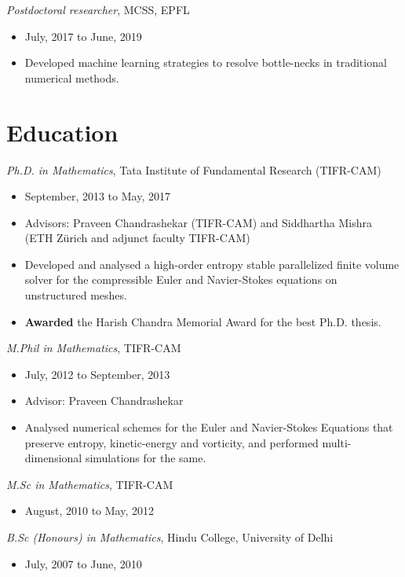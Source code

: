 \documentclass[margin]{res}
\begin{document}
\begin{resume}
{\it Postdoctoral researcher}, MCSS, EPFL
 \begin{itemize} \itemsep -2pt  %
 \item 
July, 2017 to June, 2019
\item Developed machine learning strategies to resolve bottle-necks in traditional numerical methods.  
\end{itemize}

\section{Education}
{\it Ph.D. in Mathematics}, Tata Institute of Fundamental Research (TIFR-CAM)
 \begin{itemize} \itemsep -2pt  %
 \item September, 2013 to May, 2017
 \item Advisors: Praveen Chandrashekar (TIFR-CAM) and Siddhartha Mishra (ETH Z\"{u}rich and adjunct faculty TIFR-CAM)
  \item Developed and analysed a high-order entropy stable parallelized finite volume solver for the compressible Euler and Navier-Stokes equations on unstructured meshes. 
  \item \textbf{Awarded} the Harish Chandra Memorial Award for the best Ph.D. thesis.
      
 \end{itemize}

 {\it M.Phil in Mathematics}, TIFR-CAM
 \begin{itemize} \itemsep -2pt  %
 \item July, 2012 to September, 2013
 \item Advisor: Praveen Chandrashekar
 \item Analysed numerical schemes for the Euler and Navier-Stokes Equations that preserve entropy, kinetic-energy and vorticity, and performed multi-dimensional simulations for the same.
 \end{itemize}

 {\it M.Sc in Mathematics}, TIFR-CAM
 \begin{itemize} \itemsep -2pt  %
 \item August, 2010 to May, 2012
 \end{itemize}
 
 {\it B.Sc (Honours) in Mathematics}, Hindu College, University of Delhi
 \begin{itemize} \itemsep -2pt  %
 \item July, 2007 to June, 2010
 \end{itemize}
 

\end{resume}
\end{document}

